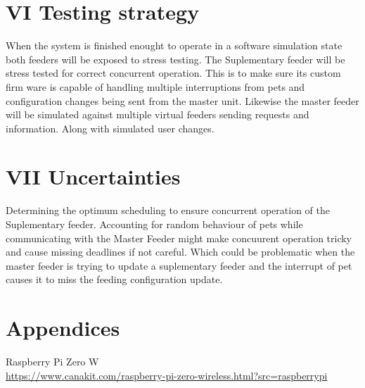 \documentclass[12pt]{article}
\begin{document}
\section{VI Testing strategy}
When the system is finished enought to operate in a software simulation state both feeders will be exposed
to stress testing.  The Suplementary feeder will be stress tested for correct concurrent operation.
This is to make sure its custom firm ware is capable of handling multiple interruptions from pets and configuration
changes being sent from the master unit. Likewise the master feeder will be simulated against multiple virtual
feeders sending requests and information. Along with simulated user changes.


\section{VII Uncertainties}
Determining the optimum scheduling to ensure concurrent operation of the Suplementary feeder.
Accounting for random behaviour of pets while communicating with the Master Feeder might
make concuurent operation tricky and cause missing deadlines if not careful.  Which could be
problematic when the master feeder is trying to update a suplementary feeder and the interrupt of pet
causes it to miss the feeding configuration update.

\newpage
\section{Appendices}

Raspberry Pi Zero W\\
\url{https://www.canakit.com/raspberry-pi-zero-wireless.html?src=raspberrypi}
\end{document}
